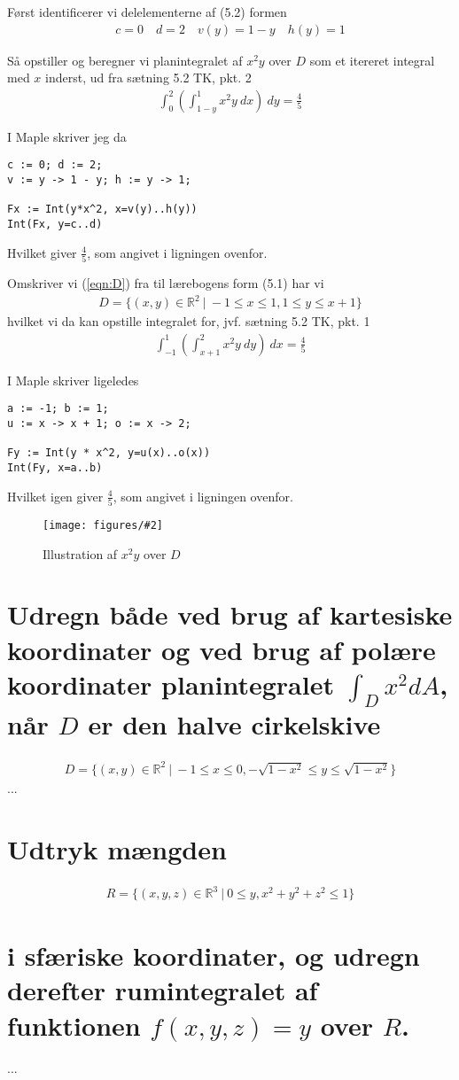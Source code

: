 \documentclass[11pt,a4paper]{article}
\newcommand{\with}[1]{{\ }d#1}
\newcommand{\Int}[4]{\int_{#1}^{#2}#3\with{#4}}
\newcommand{\fig}[4]
{
    \begin{figure}[H]
        \centering
        \texttt{[image: figures/\#2]}
        \caption{#4}
        \label{fig:#1}
    \end{figure}
}
\begin{document}
\begin{multicols}{2}
Først identificerer vi delelementerne af (5.2) formen
\begin{align}
    c = 0 \quad
    d = 2 \quad
    v(y) = 1 - y \quad
    h(y) = 1
\end{align}

Så opstiller og beregner vi planintegralet af $x^2 y$ over $D$ som et
itereret integral med $x$ inderst, ud fra sætning 5.2 TK, pkt. 2
\begin{align}
    \Int{0}{2}{ \left( \Int{1-y}{1}{x^2 y}{x} \right) }{y}
    =
    \frac{4}{5}
\end{align}

I Maple skriver jeg da
\begin{lstlisting}
c := 0; d := 2;
v := y -> 1 - y; h := y -> 1;

Fx := Int(y*x^2, x=v(y)..h(y))
Int(Fx, y=c..d)
\end{lstlisting}
Hvilket giver $\frac{4}{5}$, som angivet i ligningen ovenfor.

Omskriver vi (\ref{eqn:D}) fra til lærebogens form (5.1) har vi
\begin{align}
    D = \{ (x,y) \in \mathbb{R}^2{\ }|{\ }-1 \leq x \leq 1, 1 \leq y \leq x + 1 \}
\end{align}
hvilket vi da kan opstille integralet for, jvf. sætning 5.2 TK, pkt. 1
\begin{align}
    \Int{-1}{1}{ \left( \Int{x+1}{2}{x^2 y}{y} \right) }{x}
    = \frac{4}{5}
\end{align}

I Maple skriver ligeledes
\begin{lstlisting}
a := -1; b := 1;
u := x -> x + 1; o := x -> 2;

Fy := Int(y * x^2, y=u(x)..o(x))
Int(Fy, x=a..b)
\end{lstlisting}
Hvilket igen giver $\frac{4}{5}$, som angivet i ligningen ovenfor.

\fig{9-1-f}{9-1-f.png}{0.5}{Illustration af $x^2 y$ over $D$}

\end{multicols}

\newpage
\section
{
    \mdseries
    Udregn både ved brug af kartesiske koordinater og ved brug af polære
    koordinater planintegralet $\int_D x^2 d A$, når $D$ er den halve
    cirkelskive
}
\begin{align}
    D = \{ (x,y) \in \mathbb{R}^2{\ }|{\ }
        -1 \leq x \leq 0,
    -\sqrt{1 - x^2} \leq y \leq \sqrt{1 - x^2} \}
\end{align}
...


\section
{
    \mdseries
    Udtryk mængden
}
\begin{align}
    R = \{ (x,y,z) \in \mathbb{R}^3{\ }|{\ }0 \leq y, x^2 + y^2 + z^2 \leq 1 \}
\end{align}
\section*
{
    \mdseries
    i sfæriske koordinater, og udregn derefter rumintegralet af funktionen
    $f(x,y,z) = y$ over $R$.
}
...
\end{document}

